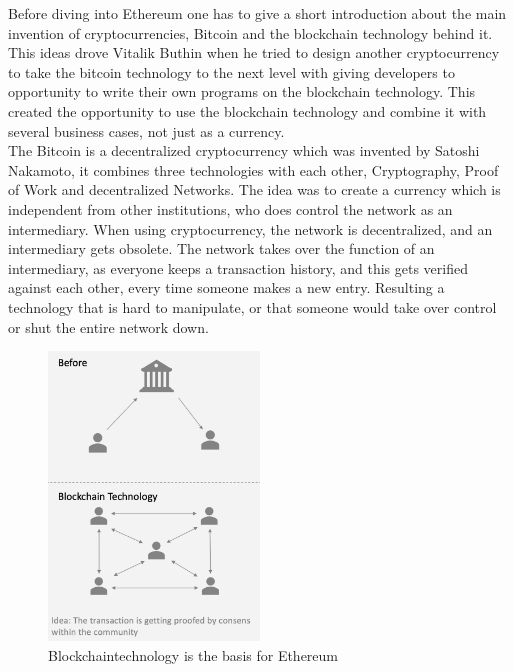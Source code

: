 Before diving into Ethereum one has to give a short introduction about the main invention of cryptocurrencies, Bitcoin and the blockchain technology behind it. This ideas drove Vitalik  Buthin when he tried to design another cryptocurrency to take the bitcoin technology to the next level with giving developers to opportunity to write their own programs on the blockchain technology. This created the opportunity to use the blockchain technology and combine it with several business cases, not just as a currency. 
\\
The Bitcoin is a decentralized cryptocurrency which was invented by Satoshi Nakamoto, it combines three technologies with each other, Cryptography, Proof of Work and decentralized Networks. The idea was to create a currency which is independent from other institutions, who does control the network as an intermediary. When using cryptocurrency, the network is decentralized, and an intermediary gets obsolete. The network takes over the function of an intermediary, as everyone keeps a transaction history, and this gets verified against each other, every time someone makes a new entry. Resulting a technology that is hard to manipulate, or that someone would take over control or shut the entire network down. \cite{grishchenko2018semantic}
\\

\begin{figure}[ht]
\caption{Blockchaintechnology is the basis for Ethereum} 
\includegraphics[width=0.5\textwidth]{blockchaintech}
\end{figure}

